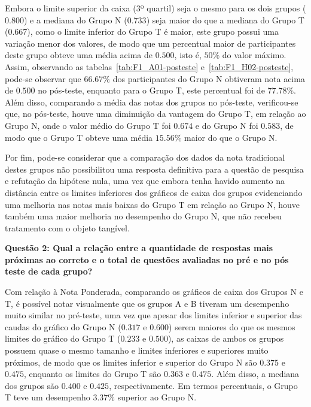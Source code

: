 Embora o limite superior da caixa (3º quartil) seja o mesmo para os dois grupos ($0.800$) e a mediana do Grupo N ($0.733$) seja maior do que a mediana do Grupo T ($0.667$), como o limite inferior do Grupo T é maior, este grupo possui uma variação menor dos valores, de modo que um percentual maior de participantes deste grupo obteve uma média acima de $0.500$, isto é, $50\%$ do valor máximo. Assim, observando as tabelas~\ref{tab:F1_A01-posteste} e~\ref{tab:F1_H02-posteste}, pode-se observar que $66.67\%$ dos participantes do Grupo N obtiveram nota acima de $0.500$ no pós-teste, enquanto para o Grupo T, este percentual foi de $77.78\%$. Além disso, comparando a média das notas dos grupos no pós-teste, verificou-se que, no pós-teste, houve uma diminuição da vantagem do Grupo T, em relação ao Grupo N, onde o valor médio do Grupo T foi $0.674$ e do Grupo N foi $0.583$, de modo que o Grupo T obteve uma média $15.56\%$ maior do que o Grupo N.

Por fim, pode-se considerar que a comparação dos dados da nota tradicional destes grupos não possibilitou uma resposta definitiva para a questão de pesquisa e refutação da hipótese nula, uma vez que embora tenha havido aumento na distância entre os limites inferiores dos gráficos de caixa dos grupos evidenciando uma melhoria nas notas mais baixas do Grupo T em relação ao Grupo N, houve também uma maior melhoria no desempenho do Grupo N, que não recebeu tratamento com o objeto tangível.


\textbf{Questão 2: Qual a relação entre a quantidade de respostas mais próximas ao correto e o total de questões avaliadas no pré e no pós teste de cada grupo?}

Com relação à Nota Ponderada, comparando os gráficos de caixa dos Grupos N e T, é possível notar visualmente que os grupos A e B tiveram um desempenho muito similar no pré-teste, uma vez que apesar dos limites inferior e superior das caudas do gráfico do Grupo N ($0.317$ e $0.600$) serem maiores do que os mesmos limites do gráfico do Grupo T ($0.233$ e $0.500$), as caixas de ambos os grupos possuem quase o mesmo tamanho e limites inferiores e superiores muito próximos, de modo que os limites inferior e superior do Grupo N são $0.375$ e $0.475$, enquanto os limites do Grupo T são $0.363$ e $0.475$. Além disso, a mediana dos grupos são $0.400$ e $0.425$, respectivamente. Em termos percentuais, o Grupo T teve um desempenho $3.37\%$ superior ao Grupo N.

